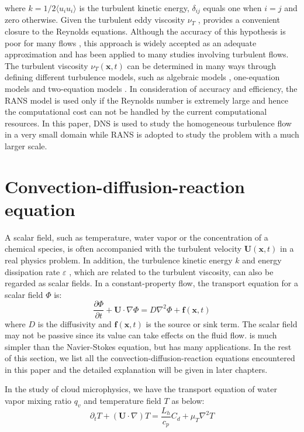 where $k = 1/2\langle u_iu_i\rangle$ is the turbulent kinetic energy, $\delta_{ij}$ equals one when $i = j$ and zero otherwise. Given the turbulent eddy viscosity $\nu_T$ \cite{PopeTurbulent2000},  provides a convenient closure to the Reynolds equations. Although the accuracy of this hypothesis is poor for many flows \cite{PopeTurbulent2000}, this approach is widely accepted as an adequate approximation and has been applied to many studies involving turbulent flows. The turbulent viscosity $\nu_T(\mathbf{x},t)$ can be determined in many ways through defining different turbulence models, such as algebraic models \cite{baldwin1978thin}, one-equation models \cite{spalart1992one} and two-equation models \cite{WilcoxTurbulence2006}. In consideration of accuracy and efficiency, the RANS model is used only if the Reynolds number is extremely large and hence the computational cost can not be handled by the current computational resources. In this paper, DNS is used to study the homogeneous turbulence flow in a very small domain while RANS is adopted to study the problem with a much larger scale.   

\section{Convection-diffusion-reaction equation}
A scalar field, such as temperature, water vapor or the concentration of a chemical species, is often accompanied with the turbulent velocity $\mathbf{U}(\mathbf{x},t)$ in a real physics problem. In addition, the turbulence kinetic energy $k$ \cite{PopeTurbulent2000} and energy dissipation rate $\varepsilon$ \cite{PopeTurbulent2000}, which are related to the turbulent viscosity, can also be regarded as scalar fields. In a constant-property flow, the transport equation for a scalar field $\Phi$ is:
\begin{equation}
\frac{\partial\Phi}{\partial t} + \mathbf{U}\cdot\nabla\Phi = D\nabla^2\Phi + \mathbf{f}(\mathbf{x},t)
\label{scal_eqn}
\end{equation}
where $D$ is the diffusivity and $\mathbf{f}(\mathbf{x},t)$ is the source or sink term. The scalar field may not be passive since its value can take effects on the fluid flow.  is much simpler than the Navier-Stokes equation, but has many applications.
In the rest of this section, we list all the convection-diffusion-reaction equations encountered in this paper and the detailed explanation will be given in later chapters.

In the study of cloud microphysics, we have the transport equation of water vapor mixing ratio $q_v$ and temperature field $T$ as below:
\begin{equation}
\partial_{t}T+(\mathbf{U}\cdot\nabla)T=\frac{L_{h}}{c_{p}}C_{d}+\mu_{T}\nabla^{2}T\label{eq:temp_eqn}
\end{equation}


